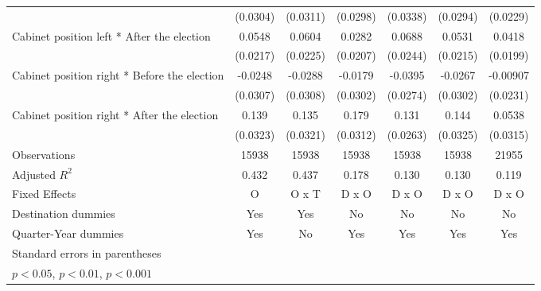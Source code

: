 \begin{table}[htbp]
\begin{tabular}{l*{6}{c}}
                    &    (0.0304)         &    (0.0311)         &    (0.0298)         &    (0.0338)         &    (0.0294)         &    (0.0229)         \\
[1em]
Cabinet position left * After the election&      0.0548\sym{*}  &      0.0604\sym{**} &      0.0282         &      0.0688\sym{**} &      0.0531\sym{*}  &      0.0418\sym{*}  \\
                    &    (0.0217)         &    (0.0225)         &    (0.0207)         &    (0.0244)         &    (0.0215)         &    (0.0199)         \\
[1em]
Cabinet position right * Before the election&     -0.0248         &     -0.0288         &     -0.0179         &     -0.0395         &     -0.0267         &    -0.00907         \\
                    &    (0.0307)         &    (0.0308)         &    (0.0302)         &    (0.0274)         &    (0.0302)         &    (0.0231)         \\
[1em]
Cabinet position right * After the election&       0.139\sym{***}&       0.135\sym{***}&       0.179\sym{***}&       0.131\sym{***}&       0.144\sym{***}&      0.0538         \\
                    &    (0.0323)         &    (0.0321)         &    (0.0312)         &    (0.0263)         &    (0.0325)         &    (0.0315)         \\
\hline
Observations        &       15938         &       15938         &       15938         &       15938         &       15938         &       21955         \\
Adjusted \(R^{2}\)  &       0.432         &       0.437         &       0.178         &       0.130         &       0.130         &       0.119         \\
Fixed Effects       &           O         &       O x T         &       D x O         &       D x O         &       D x O         &       D x O         \\
Destination dummies &         Yes         &         Yes         &          No         &          No         &          No         &          No         \\
Quarter-Year dummies&         Yes         &          No         &         Yes         &         Yes         &         Yes         &         Yes         \\
\hline\hline
\multicolumn{7}{l}{\footnotesize Standard errors in parentheses}\\
\multicolumn{7}{l}{\footnotesize \sym{*} \(p<0.05\), \sym{**} \(p<0.01\), \sym{***} \(p<0.001\)}\\
\end{tabular}
\end{table}
